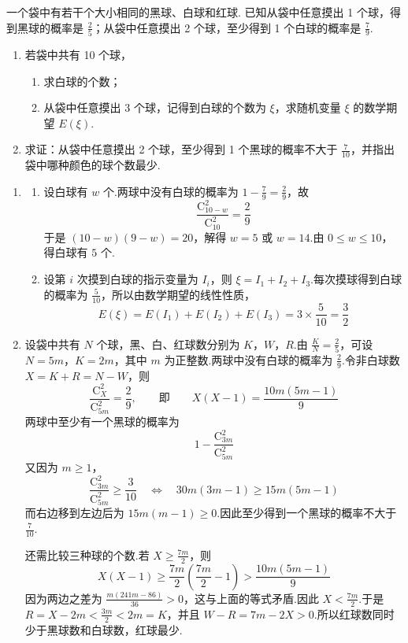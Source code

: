\begin{problem}
一个袋中有若干个大小相同的黑球、白球和红球. 已知从袋中任意摸出 1 个球，得到黑球的概率是 \(\frac{2}{5}\)；从袋中任意摸出 2 个球，至少得到 1 个白球的概率是 \(\frac{7}{9}\).

\begin{enumerate}
\item 若袋中共有 10 个球，

\begin{enumerate}
\item 求白球的个数；
\item 从袋中任意摸出 3 个球，记得到白球的个数为 \( \xi \)，求随机变量 \( \xi \) 的数学期望 \( E(\xi) \).
\end{enumerate}

\item 求证：从袋中任意摸出 2 个球，至少得到 1 个黑球的概率不大于 \(\frac{7}{10}\)，并指出袋中哪种颜色的球个数最少.
\end{enumerate}

\begin{solution}
\begin{enumerate}
\item
\begin{enumerate}
\item 设白球有 \(w\) 个.两球中没有白球的概率为 \(1-\frac79=\frac29\)，故
\[
\frac{\mathrm C_{10-w}^{2}}{\mathrm C_{10}^{2}}=\frac29
\]
于是 \((10-w)(9-w)=20\)，解得 \(w=5\) 或 \(w=14\).由 \(0\leqslant w\leqslant10\)，得白球有 \(5\) 个.
\item 设第 \(i\) 次摸到白球的指示变量为 \(I_i\)，则 \(\xi=I_1+I_2+I_3\).每次摸球得到白球的概率为 \(\frac5{10}\)，所以由数学期望的线性性质，
\[
E(\xi)=E(I_1)+E(I_2)+E(I_3)=3\times\frac5{10}=\frac32
\]
\end{enumerate}
\item 设袋中共有 \(N\) 个球，黑、白、红球数分别为 \(K\)，\(W\)，\(R\).由 \(\frac KN=\frac25\)，可设
\(N=5m\)，\(K=2m\)，其中 \(m\) 为正整数.两球中没有白球的概率为 \(\frac29\).令非白球数 \(X=K+R=N-W\)，则
\[
\frac{\mathrm C_{X}^{2}}{\mathrm C_{5m}^{2}}=\frac29,
\qquad\text{即}\qquad X(X-1)=\frac{10m(5m-1)}9
\]
两球中至少有一个黑球的概率为
\[
1-\frac{\mathrm C_{3m}^{2}}{\mathrm C_{5m}^{2}}
\]
又因为 \(m\geqslant1\)，
\[
\frac{\mathrm C_{3m}^{2}}{\mathrm C_{5m}^{2}}\geqslant\frac3{10}
\quad\Longleftrightarrow\quad
30m(3m-1)\geqslant15m(5m-1)
\]
而右边移到左边后为 \(15m(m-1)\geqslant0\).因此至少得到一个黑球的概率不大于 \(\frac7{10}\).

还需比较三种球的个数.若 \(X\geqslant\frac{7m}{2}\)，则
\[
X(X-1)\geqslant\frac{7m}{2}\left(\frac{7m}{2}-1\right)>\frac{10m(5m-1)}9
\]
因为两边之差为 \(\frac{m(241m-86)}{36}>0\)，这与上面的等式矛盾.因此
\(X<\frac{7m}{2}\).于是 \(R=X-2m<\frac{3m}{2}<2m=K\)，并且
\(W-R=7m-2X>0\).所以红球数同时少于黑球数和白球数，红球最少.
\end{enumerate}
\end{solution}
\end{problem}

